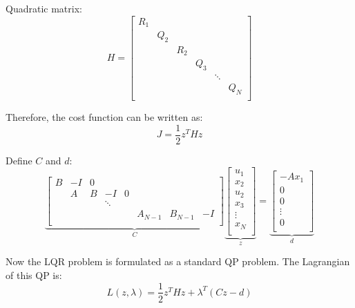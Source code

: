 Quadratic matrix:
\begin{equation}
    H=\left[ \begin{matrix}
        R_1&		&		&		&		&		\\
        &		Q_2&		&		&		&		\\
        &		&		R_2&		&		&		\\
        &		&		&		Q_3&		&		\\
        &		&		&		&		\ddots&		\\
        &		&		&		&		&		Q_N\\
    \end{matrix} \right] 
\end{equation}

Therefore, the cost function can be written as:
\begin{equation}
    J=\frac{1}{2}z^THz
\end{equation}

Define $C$ and $d$:
\begin{equation}
    \underset{C}{\underbrace{\left[ \begin{matrix}
        B&		-I&		0&		&		&		&		&		\\
        &		A&		B&		-I&		0&		&		&		\\
        &		&		&		\ddots&		&		&		&		\\
        &		&		&		&		&		A_{N-1}&		B_{N-1}&		-I\\
    \end{matrix} \right] }}\underset{z}{\underbrace{\left[ \begin{array}{c}
        u_1\\
        x_2\\
        u_2\\
        x_3\\
        \vdots\\
        x_N\\
    \end{array} \right] }}=\underset{d}{\underbrace{\left[ \begin{array}{c}
        -Ax_1\\
        0\\
        0\\
        \vdots\\
        0\\
    \end{array} \right] }}
\end{equation}

Now the LQR problem is formulated as a standard QP problem. The Lagrangian of this QP is:
\begin{equation}
    L(z,\lambda) = \frac{1}{2}z^THz+\lambda^T(Cz-d)
\end{equation}

